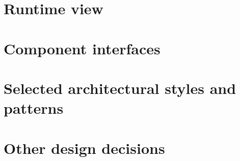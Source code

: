 \section{Runtime view}

\section{Component interfaces}

\section{Selected architectural styles and patterns}

\section{Other design decisions}